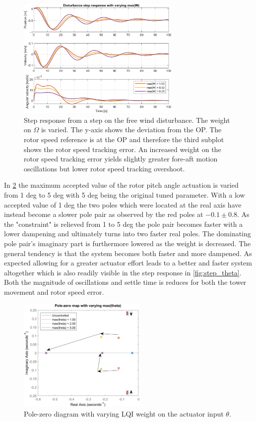 \begin{figure}[ht]
	\centering
	\includegraphics[width=0.7\textwidth]{Graphics/LQI pole zero/103_step_W.png}
	\caption{Step response from a step on the free wind disturbance. The weight on $ \Omega $ is varied. The y-axis shows the deviation from the OP. The rotor speed reference is at the OP and therefore the third subplot shows the rotor speed tracking error. An increased weight on the rotor speed tracking error yields slightly greater fore-aft motion oscillations but lower rotor speed tracking overshoot.}
	\label{fig:step_W}
\end{figure}

In \cref{fig:pzmap_theta} the maximum accepted value of the rotor pitch angle actuation is varied from 1 deg to 5 deg with 5 deg being the original tuned parameter. With a low accepted value of 1 deg the two poles which were located at the real axis have instead become a slower pole pair as observed by the red poles at $ -0.1 \pm0.8 $. As the "constraint" is relieved from 1 to 5 deg the pole pair becomes faster with a lower dampening and ultimately turns into two faster real poles. The dominating pole pair's imaginary part is furthermore lowered as the weight is decreased. The general tendency is that the system becomes both faster and more dampened. As expected allowing for a greater actuator effort leads to a better and faster system altogether which is also readily visible in the step response in \cref{fig:step_theta}. Both the magnitude of oscillations and settle time is reduces for both the tower movement and rotor speed error.
\begin{figure}[ht]
	\centering
	\includegraphics[width=0.55\textwidth]{Graphics/LQI pole zero/05_pzmap_theta.png}
	\caption{Pole-zero diagram with varying LQI weight on the actuator input $ \theta $.}
	\label{fig:pzmap_theta}
\end{figure}

